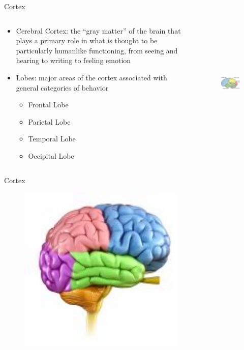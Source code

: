 \documentclass{beamer} %
\begin{document}
\begin{frame}{Cortex}
\begin{columns}
\begin{column}{0.45\textwidth}
\begin{itemize}
    \item Cerebral Cortex: the “gray matter” of the brain that plays a primary role in what is thought to be particularly humanlike functioning, from seeing and hearing to writing to feeling emotion
    \item Lobes: major areas of the cortex associated with general categories of behavior
\begin{itemize}
    \item Frontal Lobe
    \item Parietal Lobe
    \item Temporal Lobe
    \item Occipital Lobe
\end{itemize}
\end{itemize}
\end{column}
\begin{column}{0.65\textwidth}
\begin{figure}
    \includegraphics[width=\textwidth,height = 6cm]{6645d46c_151a22e0018__8000_00008559.png}
\end{figure}
\end{column}
\end{columns}
\end{frame}
\begin{frame}{Cortex}
\begin{figure}
    \includegraphics[width=\textwidth,height = 8cm]{brain-lobe-function-diagram-unique-brain-anatomy-the-4-lobes-structures-and-functions-150x150.jpg}
\end{figure}
\end{frame}
\end{document}
